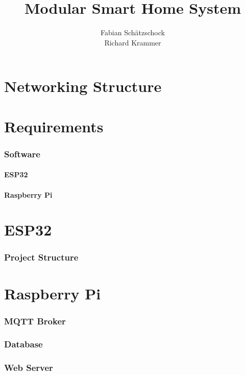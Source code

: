 \documentclass[12pt]{scrreport}
\title{Modular Smart Home System}
\author{Fabian Schätzschock \\ Richard Krammer}
\begin{document}
    \maketitle \newpage
    \tableofcontents \newpage

    \chapter{Networking Structure}
    
    \chapter{Requirements}
    \subsection{Software}
    \subsubsection{ESP32}
    \subsubsection{Raspberry Pi}

    \chapter{ESP32}
    \subsection{Project Structure}
    \chapter{Raspberry Pi}
    \subsection{MQTT Broker}
    \subsection{Database}
    \subsection{Web Server}

\end{document}
